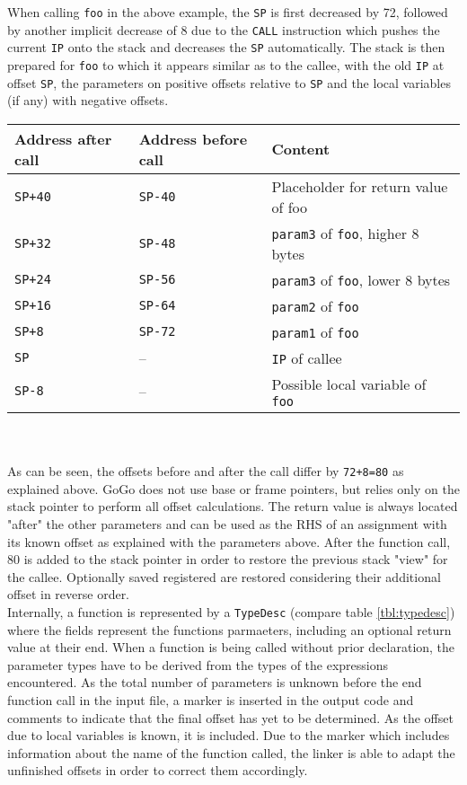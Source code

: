 \documentclass[a4paper]{scrreprt}
\begin{document}
      When calling \texttt{foo} in the above example, the \texttt{SP} is first decreased by 72, followed by another implicit decrease of 8 due to the \texttt{CALL} instruction which pushes the current \texttt{IP} onto the stack and decreases the \texttt{SP} automatically. The stack is then prepared for \texttt{foo} to which it appears similar as to the callee, with the old \texttt{IP} at offset \texttt{SP}, the parameters on positive offsets relative to \texttt{SP} and the local variables (if any) with negative offsets.
      \begin{table}[h!]
      \begin{tabular}{lll}
        \toprule
        \textbf{Address after call} & \textbf{Address before call} & \textbf{Content}\\
        \midrule
        \texttt{SP+40} & \texttt{SP-40} & Placeholder for return value of foo\\
        \texttt{SP+32} & \texttt{SP-48} & \texttt{param3} of \texttt {foo}, higher 8 bytes\\
        \texttt{SP+24} & \texttt{SP-56} & \texttt{param3} of \texttt {foo}, lower 8 bytes\\
        \texttt{SP+16} & \texttt{SP-64} & \texttt{param2} of \texttt {foo}\\
        \texttt{SP+8} & \texttt{SP-72} & \texttt{param1} of \texttt {foo}\\
        \texttt{SP} & -- & \texttt{IP} of callee\\
        \texttt{SP-8} & -- & Possible local variable of \texttt{foo}\\
        \bottomrule
      \end{tabular}
      \end{table}\\ \\
      As can be seen, the offsets before and after the call differ by \texttt{72+8=80} as explained above. GoGo does not use base or frame pointers, but relies only on the stack pointer to perform all offset calculations. The return value is always located "after" the other parameters and can be used as the RHS of an assignment with its known offset as explained with the parameters above. After the function call, 80 is added to the stack pointer in order to restore the previous stack "view" for the callee. Optionally saved registered are restored considering their additional offset in reverse order.\\
      Internally, a function is represented by a \texttt{TypeDesc} (compare table \ref{tbl:typedesc}) where the fields represent the functions parmaeters, including an optional return value at their end. When a function is being called without prior declaration, the parameter types have to be derived from the types of the expressions encountered. As the total number of parameters is unknown before the end function call in the input file, a marker is inserted in the output code and comments to indicate that the final offset has yet to be determined. As the offset due to local variables is known, it is included. Due to the marker which includes information about the name of the function called, the linker is able to adapt the unfinished offsets in order to correct them accordingly.\\
\end{document}
